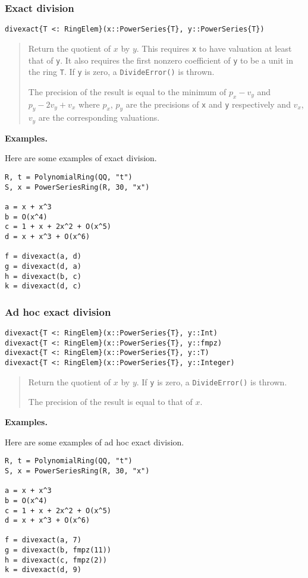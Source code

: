 \documentclass[a4paper,10pt]{article}
\newcommand{\code}{\lstinline}
\newcommand{\desc}[1]{\vspace{-3mm}\begin{quote}#1\end{quote}}
\begin{document}
\subsubsection{Exact division}

\begin{lstlisting}
divexact{T <: RingElem}(x::PowerSeries{T}, y::PowerSeries{T})
\end{lstlisting}

\desc{Return the quotient of $x$ by $y$. This requires \code{x} to have
valuation at least that of \code{y}. It also requires the first nonzero
coefficient of \code{y} to be a unit in the ring \code{T}. If \code{y}
is zero, a \code{DivideError()} is thrown. 

The precision of the result is equal to the minimum of $p_x - v_y$
and $p_y - 2v_y + v_x$ where $p_x$, $p_y$ are the precisions of \code{x} and
\code{y} respectively and $v_x$, $v_y$ are the corresponding valuations.}

\textbf{Examples.}

Here are some examples of exact division.

\begin{lstlisting}
R, t = PolynomialRing(QQ, "t")
S, x = PowerSeriesRing(R, 30, "x")

a = x + x^3
b = O(x^4)
c = 1 + x + 2x^2 + O(x^5)
d = x + x^3 + O(x^6)

f = divexact(a, d)
g = divexact(d, a)
h = divexact(b, c)
k = divexact(d, c)
\end{lstlisting}

\subsubsection{Ad hoc exact division}

\begin{lstlisting}
divexact{T <: RingElem}(x::PowerSeries{T}, y::Int)
divexact{T <: RingElem}(x::PowerSeries{T}, y::fmpz)
divexact{T <: RingElem}(x::PowerSeries{T}, y::T)
divexact{T <: RingElem}(x::PowerSeries{T}, y::Integer)
\end{lstlisting}

\desc{Return the quotient of $x$ by $y$. If \code{y} is zero, a
\code{DivideError()} is thrown. 

The precision of the result is equal to that of $x$.}

\textbf{Examples.}

Here are some examples of ad hoc exact division.

\begin{lstlisting}
R, t = PolynomialRing(QQ, "t")
S, x = PowerSeriesRing(R, 30, "x")

a = x + x^3
b = O(x^4)
c = 1 + x + 2x^2 + O(x^5)
d = x + x^3 + O(x^6)

f = divexact(a, 7)
g = divexact(b, fmpz(11))
h = divexact(c, fmpz(2))
k = divexact(d, 9)
\end{lstlisting}
\end{document}
